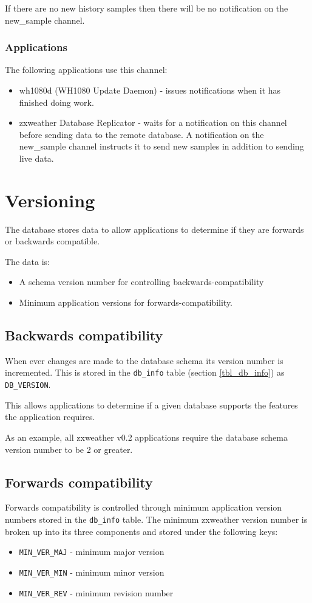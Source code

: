 \documentclass[a4paper,10pt]{book}
\begin{document}
If there are no new history samples then there will be no notification on the new\_sample channel.

\subsection{Applications}
The following applications use this channel:

\begin{itemize}
\item wh1080d (WH1080 Update Daemon) - issues notifications when it has finished doing work.
\item zxweather Database Replicator - waits for a notification on this channel before sending data to the remote database. A notification on the new\_sample channel instructs it to send new samples in addition to sending live data.
\end{itemize}

\chapter{Versioning}
\label{cha_version}
The database stores data to allow applications to determine if they are forwards or backwards compatible.

The data is:
\begin{itemize}
\item A schema version number for controlling backwards-compatibility
\item Minimum application versions for forwards-compatibility.
\end{itemize}

\section{Backwards compatibility}
When ever changes are made to the database schema its version number is incremented. This is stored in the \verb|db_info| table (section \ref{tbl_db_info}) as \verb|DB_VERSION|.

This allows applications to determine if a given database supports the features the application requires. 

As an example, all zxweather v0.2 applications require the database schema version number to be 2 or greater.

\section{Forwards compatibility}
Forwards compatibility is controlled through minimum application version numbers stored in the \verb|db_info| table. The minimum zxweather version number is broken up into its three components and stored under the following keys:
\begin{itemize}
\item \verb|MIN_VER_MAJ| - minimum major version
\item \verb|MIN_VER_MIN| - minimum minor version
\item \verb|MIN_VER_REV| - minimum revision number
\end{itemize}
\end{document}
